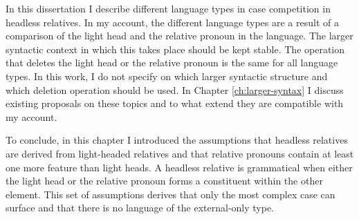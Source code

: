 In this dissertation I describe different language types in case competition in headless relatives. In my account, the different language types are a result of a comparison of the light head and the relative pronoun in the language.
The larger syntactic context in which this takes place should be kept stable. The operation that deletes the light head or the relative pronoun is the same for all language types. In this work, I do not specify on which larger syntactic structure and which deletion operation should be used. In Chapter \ref{ch:larger-syntax} I discuss existing proposals on these topics and to what extend they are compatible with my account.

To conclude, in this chapter I introduced the assumptions that headless relatives are derived from light-headed relatives and that relative pronouns contain at least one more feature than light heads. A headless relative is grammatical when either the light head or the relative pronoun forms a constituent within the other element. This set of assumptions derives that only the most complex case can surface and that there is no language of the external-only type.

